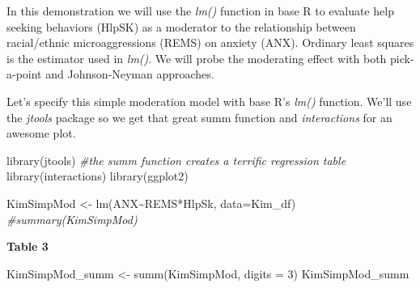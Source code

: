 \documentclass[
  english,
]{book}
\newenvironment{Shaded}{\begin{snugshade}}{\end{snugshade}}
\newcommand{\AttributeTok}[1]{\textcolor[rgb]{0.77,0.63,0.00}{#1}}
\newcommand{\CommentTok}[1]{\textcolor[rgb]{0.56,0.35,0.01}{\textit{#1}}}
\newcommand{\DecValTok}[1]{\textcolor[rgb]{0.00,0.00,0.81}{#1}}
\newcommand{\FunctionTok}[1]{\textcolor[rgb]{0.00,0.00,0.00}{#1}}
\newcommand{\NormalTok}[1]{#1}
\newcommand{\OtherTok}[1]{\textcolor[rgb]{0.56,0.35,0.01}{#1}}
\newcommand{\SpecialCharTok}[1]{\textcolor[rgb]{0.00,0.00,0.00}{#1}}
\begin{document}
In this demonstration we will use the \emph{lm()} function in base R to evaluate help seeking behaviors (HlpSK) as a moderator to the relationship between racial/ethnic microaggressions (REMS) on anxiety (ANX). Ordinary least squares is the estimator used in \emph{lm()}. We will probe the moderating effect with both pick-a-point and Johnson-Neyman approaches.

Let's specify this simple moderation model with base R's \emph{lm()} function. We'll use the \emph{jtools} package so we get that great summ function and \emph{interactions} for an awesome plot.

\begin{Shaded}
\begin{Highlighting}[]
\FunctionTok{library}\NormalTok{(jtools) }\CommentTok{\#the summ function creates a terrific regression table}
\FunctionTok{library}\NormalTok{(interactions)}
\FunctionTok{library}\NormalTok{(ggplot2)}

\NormalTok{KimSimpMod }\OtherTok{\textless{}{-}} \FunctionTok{lm}\NormalTok{(ANX}\SpecialCharTok{\textasciitilde{}}\NormalTok{REMS}\SpecialCharTok{*}\NormalTok{HlpSk, }\AttributeTok{data=}\NormalTok{Kim\_df)}
\CommentTok{\#summary(KimSimpMod)}
\end{Highlighting}
\end{Shaded}

\textbf{Table 3}

\begin{Shaded}
\begin{Highlighting}[]
\NormalTok{KimSimpMod\_summ }\OtherTok{\textless{}{-}} \FunctionTok{summ}\NormalTok{(KimSimpMod, }\AttributeTok{digits =} \DecValTok{3}\NormalTok{)}
\NormalTok{KimSimpMod\_summ}
\end{Highlighting}
\end{Shaded}
\end{document}
